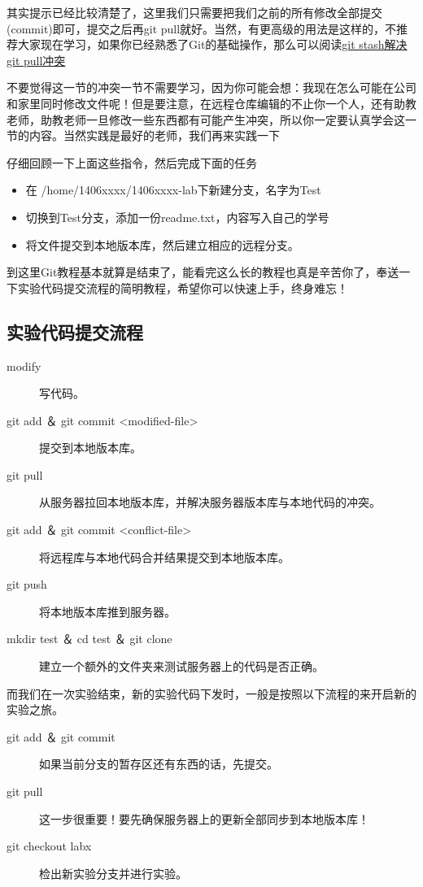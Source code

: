 其实提示已经比较清楚了，这里我们只需要把我们之前的所有修改全部提交(commit)即可，提交之后再git pull就好。当然，有更高级的用法是这样的，不推荐大家现在学习，如果你已经熟悉了Git的基础操作，那么可以阅读\href{http://www.01happy.com/git-resolve-conflicts/}{git stash解决git pull冲突}

不要觉得这一节的冲突一节不需要学习，因为你可能会想：我现在怎么可能在公司和家里同时修改文件呢！但是要注意，在远程仓库编辑的不止你一个人，还有助教老师，助教老师一旦修改一些东西都有可能产生冲突，所以你一定要认真学会这一节的内容。当然实践是最好的老师，我们再来实践一下

\begin{exercise}
仔细回顾一下上面这些指令，然后完成下面的任务
  \begin{itemize}
    \item 在 /home/1406xxxx/1406xxxx-lab下新建分支，名字为Test
    \item 切换到Test分支，添加一份readme.txt，内容写入自己的学号
    \item 将文件提交到本地版本库，然后建立相应的远程分支。
  \end{itemize}
\end{exercise}

到这里Git教程基本就算是结束了，能看完这么长的教程也真是辛苦你了，奉送一下实验代码提交流程的简明教程，希望你可以快速上手，终身难忘！

\subsection{实验代码提交流程}

\begin{description}
\item[modify] 写代码。
\item[git add ＆ git commit <modified-file>] 提交到本地版本库。
\item[git pull] 从服务器拉回本地版本库，并解决服务器版本库与本地代码的冲突。
\item[git add ＆ git commit <conflict-file>] 将远程库与本地代码合并结果提交到本地版本库。
\item[git push] 将本地版本库推到服务器。
\item[mkdir test ＆ cd test ＆ git clone] 建立一个额外的文件夹来测试服务器上的代码是否正确。
\end{description}

而我们在一次实验结束，新的实验代码下发时，一般是按照以下流程的来开启新的实验之旅。

\begin{description}
\item[git add ＆ git commit] 如果当前分支的暂存区还有东西的话，先提交。
\item[git pull] 这一步很重要！要先确保服务器上的更新全部同步到本地版本库！
\item[git checkout labx] 检出新实验分支并进行实验。
\end{description}

